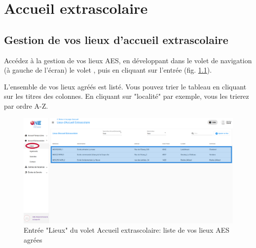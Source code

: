 \chapter{Accueil extrascolaire}
\section{Gestion de vos lieux d'accueil extrascolaire}
Accédez à la gestion de vos lieux AES, en développant dans le volet de navigation (à gauche de l'écran) le volet , puis en cliquant sur l'entrée  (fig. \ref{fig:aes_lieux}).

L'ensemble de vos lieux agréés est listé. Vous pouvez trier le tableau en cliquant sur les titres des colonnes. En cliquant sur "localité" par exemple, vous les trierez par ordre A-Z. 

\begin{figure}[htbp]
    \centering
    \includegraphics[width=15cm]{Images/aes/lieux.png}
    \caption{Entrée "Lieux" du volet Accueil extrascolaire: liste de vos lieux AES agrées}
    \label{fig:aes_lieux}
\end{figure}


